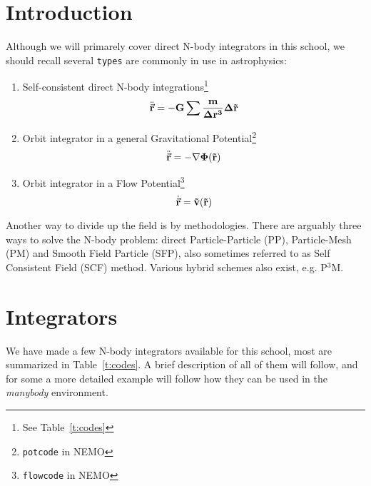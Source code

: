 {{\chapter                {Introduction}

Although we will primarely cover direct N-body integrators in this school,
we should recall several {\tt types} are commonly in use
in astrophysics:

\begin{enumerate}
\item
Self-consistent direct N-body integrations\footnote{See Table~\ref{t:codes}}
\begin{equation}
    \ddot{\vec{\bf r}} = -G \sum{ {m\over{\Delta r^3}} \Delta \vec{\bf r}}
\end{equation}

\item
Orbit integrator in a general Gravitational Potential\footnote{{\tt potcode} in NEMO}
\begin{equation}
    \ddot{\vec{\bf r}} = -\nabla \Phi(\vec{\bf r})
\end{equation} 

\item
Orbit integrator in a Flow Potential\footnote{{\tt flowcode} in NEMO}
\begin{equation}
    \dot{\vec{\bf r}} = \vec{\bf v}(\vec{\bf r})
\end{equation}



\end{enumerate}

Another way to divide up the field is by methodologies. There are arguably
three ways to solve the N-body problem: direct Particle-Particle (PP),
Particle-Mesh (PM) and Smooth Field Particle (SFP), also sometimes 
referred to as Self Consistent Field (SCF) method. Various hybrid schemes
also exist, e.g. P$^3$M.
\smallskip

\chapter                {Integrators}

We have made a few N-body integrators available for this school, most 
are summarized
in Table~\ref{t:codes}. A brief description of all of them will follow, and 
for some a more detailed example will follow how they
can be used in the {\it manybody} environment. 


}}
